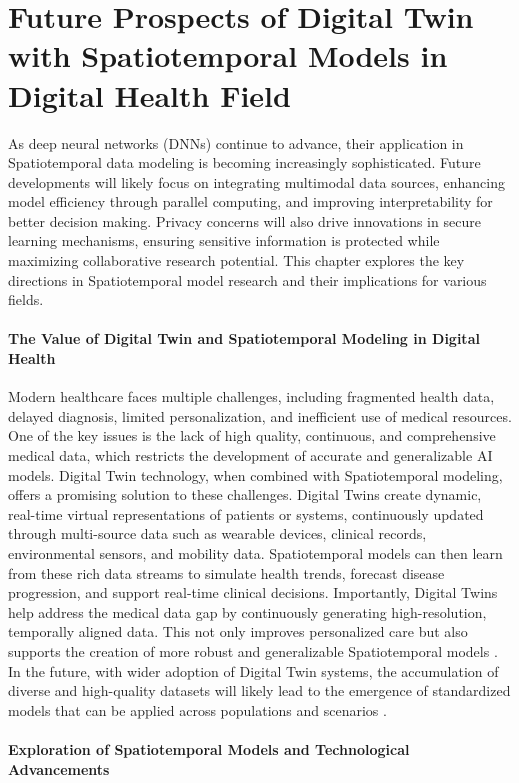 \documentclass[acmsmall]{acmart}
\begin{document}
\section{Future Prospects of Digital Twin with Spatiotemporal Models in Digital Health Field}
\label{sec:future}
As deep neural networks (DNNs) continue to advance, their application in Spatiotemporal data modeling is becoming increasingly sophisticated. Future developments will likely focus on integrating multimodal data sources, enhancing model efficiency through parallel computing, and improving interpretability for better decision making. Privacy concerns will also drive innovations in secure learning mechanisms, ensuring sensitive information is protected while maximizing collaborative research potential. This chapter explores the key directions in Spatiotemporal model research and their implications for various fields.
\paragraph{The Value of Digital Twin and Spatiotemporal Modeling in Digital Health}

Modern healthcare faces multiple challenges, including fragmented health data, delayed diagnosis, limited personalization, and inefficient use of medical resources. One of the key issues is the lack of high quality, continuous, and comprehensive medical data, which restricts the development of accurate and generalizable AI models. Digital Twin technology, when combined with Spatiotemporal modeling, offers a promising solution to these challenges. Digital Twins create dynamic, real-time virtual representations of patients or systems, continuously updated through multi-source data such as wearable devices, clinical records, environmental sensors, and mobility data. Spatiotemporal models can then learn from these rich data streams to simulate health trends, forecast disease progression, and support real-time clinical decisions. Importantly, Digital Twins help address the medical data gap by continuously generating high-resolution, temporally aligned data. This not only improves personalized care but also supports the creation of more robust and generalizable Spatiotemporal models \cite{ali2024spatialtwins}. In the future, with wider adoption of Digital Twin systems, the accumulation of diverse and high-quality datasets will likely lead to the emergence of standardized models that can be applied across populations and scenarios \cite{bilal2025cityseircast}.

\paragraph{Exploration of Spatiotemporal Models and Technological Advancements}
\end{document}

